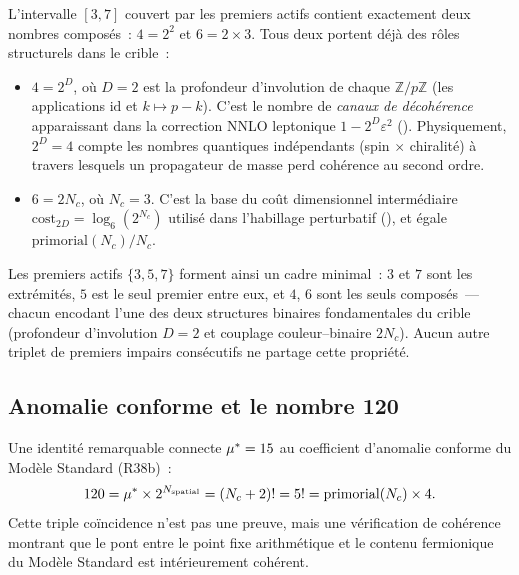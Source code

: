 \documentclass[12pt,a4paper]{article}
\begin{document}
\begin{remarque}
\label{rem:composites_4_6}
L'intervalle $[3,7]$ couvert par les premiers actifs contient
exactement deux nombres composés~: $4 = 2^2$ et $6 = 2 \times 3$.
Tous deux portent déjà des rôles structurels dans le crible~:
\begin{itemize}[nosep]
\item $4 = 2^D$, où $D = 2$ est la profondeur d'involution de chaque
  $\mathbb{Z}/p\mathbb{Z}$ (les applications $\mathrm{id}$ et
  $k \mapsto p-k$).
  C'est le nombre de \emph{canaux de décohérence} apparaissant dans
  la correction NNLO leptonique $1 - 2^D \varepsilon^2$
  (\cite{companion_physics}). Physiquement, $2^D = 4$ compte les
  nombres quantiques indépendants (spin $\times$ chiralité) à travers
  lesquels un propagateur de masse perd cohérence au second ordre.
\item $6 = 2 N_c$, où $N_c = 3$. C'est la base du coût dimensionnel
  intermédiaire $\mathrm{cost}_{2D} = \log_6(2^{N_c})$ utilisé dans
  l'habillage perturbatif (\cite{companion_physics}), et égale
  $\mathrm{primorial}(N_c)/N_c$.
\end{itemize}
Les premiers actifs $\{3, 5, 7\}$ forment ainsi un cadre minimal~:
$3$ et $7$ sont les extrémités, $5$ est le seul premier entre eux,
et $4$, $6$ sont les seuls composés~--- chacun encodant l'une des
deux structures binaires fondamentales du crible (profondeur
d'involution $D = 2$ et couplage couleur--binaire $2 N_c$).
Aucun autre triplet de premiers impairs consécutifs ne partage
cette propriété.
\end{remarque}

\subsection{Anomalie conforme et le nombre 120}
\label{sec:ch8_conformal}

Une identité remarquable connecte ${\mu^{*}} = 15$ au coefficient
d'anomalie conforme du Modèle Standard (R38b)~:
\begin{equation}
  120 = {\mu^{*}} \times 2^{N_{\rm spatial}} = (N_c + 2)! = 5! = \mathrm{primorial}(N_c) \times 4.
  \label{eq:conformal_120}
\end{equation}
Cette triple coïncidence n'est pas une preuve, mais une vérification
de cohérence montrant que le pont entre le point fixe arithmétique
et le contenu fermionique du Modèle Standard est intérieurement
cohérent.
\end{document}
